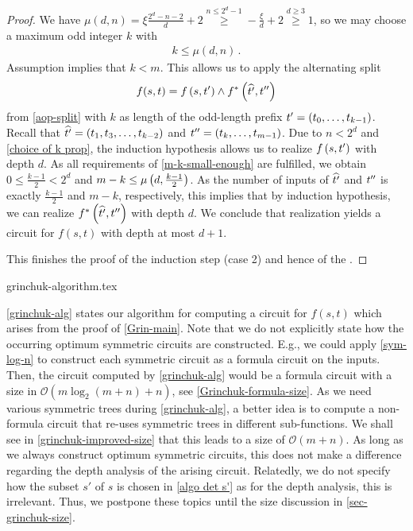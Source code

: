 \begin{proof}
   We have 
   $\mu(d, n) = \xi \frac{2^d - n - 2}{d} + 2 \overset{n \leq 2^d - 1}{\geq} -\frac{\xi}{d} + 2 \overset{d \geq 3}{\geq} 1$,
   so we may choose a maximum odd integer $k$ with
  \begin{align} \label{choice of k prop}
   k \leq \mu(d, n)\,.
  \end{align}
  Assumption  implies that $k < m$.
  This allows us to apply the alternating split
  \begin{align}
   f(s, t) = f\Bkt{s, \prefix{t}{2k+1}} \land f^*\Bkt{\everysecond{\prefix{t}{2k+1}}, \suffix{t}{2k+1}} \label{Grinchuk alternating split}
  \end{align}
  from \cref{aop-split} with $k$ as length of the odd-length prefix $\prefix{t}{2k+1} = \Bkt{t_0, \dotsc, t_{k-1}}$.
  Recall that
  $\widehat{t'} = \Bkt{t_1, t_3, \dotsc, t_{k-2}}$
  and $t'' = \Bkt{t_{k}, \dotsc, t_{m-1}}$.
  Due to $n < 2^d$ and \cref{choice of k prop},
  the induction hypothesis allows us to realize $f\Bkt{s, \prefix{t}{2k+1}}$ with depth $d$.
  As all requirements of \cref{m-k-small-enough} are fulfilled,
  we obtain $0 \leq \frac{k-1}{2} < 2^d$ and
  $m - k \leq \mu \Bkt{d, \frac{k-1}{2}}$.
  As the number of inputs of $\everysecond{\prefix{t}{2k+1}}$ and $\suffix{t}{2k+1}$
  is exactly $\frac{k-1}{2}$ and $m - k$, respectively,
  this implies that by induction hypothesis,
  we can realize $f^*\Bkt{\everysecond{\prefix{t}{2k+1}}, \suffix{t}{2k+1}}$
  with depth $d$.
  We conclude that realization  yields
  a circuit for $f(s, t)$ with depth at most $d+1$.

  This finishes the proof of the induction step (case 2) and hence of the .
  \end{proof}


{grinchuk-algorithm.tex}



\cref{grinchuk-alg} states our algorithm for computing a
circuit for $f(s, t)$ which arises from the proof of \cref{Grin-main}.
Note that we do not explicitly state how the occurring optimum symmetric circuits are constructed.
E.g., we could apply \cref{sym-log-n}
to construct each symmetric circuit as a formula circuit on the inputs.
Then, the circuit computed by \cref{grinchuk-alg}
would be a formula circuit with a size in $\mathcal O(m \log_2(m + n) + n)$,
see \cref{Grinchuk-formula-size}.
As we need various symmetric trees during \cref{grinchuk-alg},
a better idea is to compute a non-formula circuit
that re-uses symmetric trees in different sub-functions.
We shall see in \cref{grinchuk-improved-size}
that this leads to a size of $\mathcal O(m + n)$.
As long as we always construct optimum symmetric circuits,
this does not make a difference regarding the depth analysis of the arising circuit.
Relatedly, we do not specify how the subset $s'$ of $s$ is chosen in \cref{algo det s'}
as for the depth analysis, this is irrelevant.
Thus, we postpone these topics until the size discussion in \cref{sec-grinchuk-size}.

